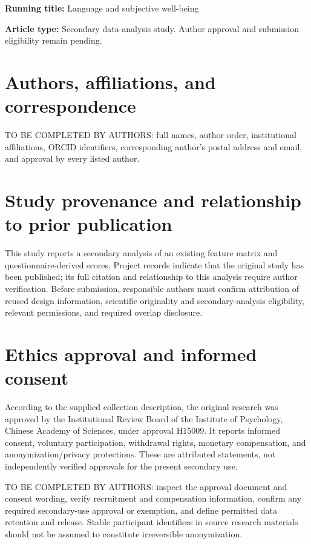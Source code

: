 

\noindent\textbf{Running title:} Language and subjective well-being

\noindent\textbf{Article type:} Secondary data-analysis study. Author approval and submission eligibility remain pending.

\section{Authors, affiliations, and correspondence}
TO BE COMPLETED BY AUTHORS: full names, author order, institutional affiliations, ORCID identifiers, corresponding author's postal address and email, and approval by every listed author.

\section{Study provenance and relationship to prior publication}
This study reports a secondary analysis of an existing feature matrix and questionnaire-derived scores. Project records indicate that the original study has been published; its full citation and relationship to this analysis require author verification. Before submission, responsible authors must confirm attribution of reused design information, scientific originality and secondary-analysis eligibility, relevant permissions, and required overlap disclosure.

\section{Ethics approval and informed consent}
According to the supplied collection description, the original research was approved by the Institutional Review Board of the Institute of Psychology, Chinese Academy of Sciences, under approval H15009. It reports informed consent, voluntary participation, withdrawal rights, monetary compensation, and anonymization/privacy protections. These are attributed statements, not independently verified approvals for the present secondary use.

TO BE COMPLETED BY AUTHORS: inspect the approval document and consent wording, verify recruitment and compensation information, confirm any required secondary-use approval or exemption, and define permitted data retention and release. Stable participant identifiers in source research materials should not be assumed to constitute irreversible anonymization.


